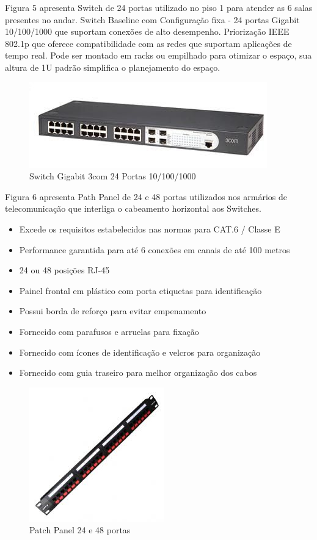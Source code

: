 \documentclass[	DIV=calc,%
							paper=a4,%
							fontsize=12pt,%
							onecolumn]{scrartcl}	 					%
\begin{document}
Figura 5 apresenta Switch de 24 portas utilizado no piso 1 para atender as 6 salas presentes no andar.
Switch Baseline com Configuração fixa - 24 portas Gigabit 10/100/1000 que suportam conexões de alto desempenho.
Priorização IEEE 802.1p que oferece compatibilidade com as redes que suportam aplicações de tempo real.
Pode ser montado em racks ou empilhado para otimizar o espaço, sua altura de 1U padrão simplifica o planejamento do espaço.

\begin{figure}
	\centering
	\includegraphics[]{sw24}
	\caption{Switch Gigabit 3com 24 Portas 10/100/1000 }
	\label{fig5}
\end{figure}


Figura 6 apresenta Path Panel de 24 e 48 portas utilizados nos armários de telecomunicação que interliga o cabeamento horizontal aos Switches.
\begin{itemize}
\item Excede os requisitos estabelecidos nas normas para CAT.6 / Classe E
\item Performance garantida para até 6 conexões em canais de até 100 metros
\item 24 ou 48 posições RJ-45
\item Painel frontal em plástico com porta etiquetas para identificação
\item Possui borda de reforço para evitar empenamento 
\item Fornecido com parafusos e arruelas para fixação
\item Fornecido com ícones de identificação e velcros para organização
\item Fornecido com guia traseiro para melhor organização dos cabos
\end{itemize}

\begin{figure}
	\centering
	\includegraphics[]{pp2448}
	\caption{Patch Panel 24 e 48 portas}
	\label{fig6}
\end{figure}
\end{document}
